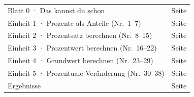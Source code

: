 \documentclass[11pt]{article}
\begin{document}
\weit
{}
\begin{tabular}{@{}p{12.5cm}r@{}}
Blatt 0 · Das kannst du schon & Seite \pageref{b0}\\
Einheit 1 · Prozente als Anteile (Nr.\ 1--7) & Seite \pageref{e1}\\
Einheit 2 · Prozentsatz berechnen (Nr.\ 8--15) & Seite \pageref{e2}\\
Einheit 3 · Prozentwert berechnen (Nr.\ 16--22) & Seite \pageref{e3}\\
Einheit 4 · Grundwert berechnen (Nr.\ 23--29) & Seite \pageref{e4}\\
Einheit 5 · Prozentuale Veränderung (Nr.\ 30--38) & Seite \pageref{e5}\\
Ergebnisse & Seite \pageref{erg}\\
\end{tabular}
\clearpage

\begleitteil\label{erg}

\end{document}
